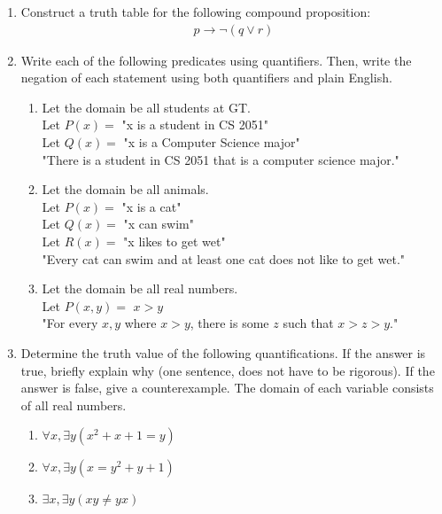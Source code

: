 \documentclass{article}
\begin{document}
\begin{enumerate}
\begin{enumerate}
        \item If a natural number $N$ is odd, $N^2 - 1$ is divisible by 4.
        \item If $N$ is an natural number and $N^3$ is not even, then $N$ is not even (Hint: try using the contrapositive)
    \end{enumerate}
    \item Construct a truth table for the following compound proposition:
    \begin{gather*}
        p \rightarrow \neg (q \lor r)
    \end{gather*}
    \item Write each of the following predicates using quantifiers. Then, write the negation of each statement using both quantifiers and plain English.
    \begin{enumerate}
        \item Let the domain be all students at GT. \\ 
            Let $P(x) = $ "x is a student in CS 2051" \\ 
            Let $Q(x) = $ "x is a Computer Science major" \\
            "There is a student in CS 2051 that is a computer science major."
        \item Let the domain be all animals. \\ 
            Let $P(x) = $ "x is a cat" \\ 
            Let $Q(x) = $ "x can swim" \\
            Let $R(x) = $ "x likes to get wet" \\
            "Every cat can swim and at least one cat does not like to get wet."
        \item Let the domain be all real numbers. \\ 
            Let $P(x, y) = $ $x > y$ \\ 
            "For every $x, y$ where $x > y$, there is some $z$ such that $x > z > y$."
    \end{enumerate}
    \item Determine the truth value of the following quantifications. If the answer is true, briefly explain why (one sentence, does not have to be rigorous). If the answer is false, give a counterexample. The domain of each variable consists of all real numbers.
    \begin{enumerate}
        \item $\forall x, \exists y (x^2 + x + 1 = y)$
        \item $\forall x, \exists y (x = y^2 + y + 1)$
        \item $\exists x, \exists y (xy \neq yx)$
    \end{enumerate}
\end{enumerate}
\end{document}
